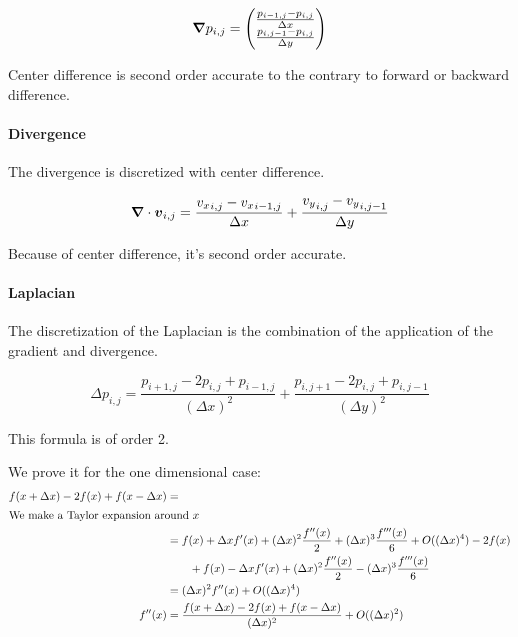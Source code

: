 \begin{equation}
  {\boldsymbol {\nabla}}p_{i,j}=\begin{pmatrix}
                       	\frac{p_{i-1,j}-p_{i,j}}{\Delta x}\\
                       	\frac{p_{i,j-1}-p_{i,j}}{\Delta y}\\
                       \end{pmatrix}
\end{equation}

Center difference is second order accurate to the contrary to forward or backward difference.

\paragraph{Divergence}
\label{fixed:divergence}
The divergence is discretized with center difference.

\begin{equation}
	{\boldsymbol {\nabla}}\cdot {\boldsymbol {v}}_{i,j}=\frac{{v_{x}}_{i,j}-{v_{x}}_{i-1,j}}{\Delta x}+\frac{{v_{y}}_{i,j}-{v_{y}}_{i,j-1}}{\Delta y}
\end{equation}

Because of center difference, it's second order accurate.

\paragraph{Laplacian}
\label{fixed:Laplacian}
The discretization of the Laplacian is the combination of the application of the gradient and divergence.

\begin{equation}
  \Delta p_{i,j}=\frac{p_{i+1,j}-2p_{i,j}+p_{i-1,j}}{(\Delta x)^2}+\frac{p_{i,j+1}-2p_{i,j}+p_{i,j-1}}{(\Delta y)^2}
\end{equation}

This formula is of order 2.

We prove it for the one dimensional case:
\begin{align*}
  f(x+\Delta x)-2f(x)+f(x-\Delta x)&=\\
  \intertext{We make a Taylor expansion around $x$}
  &=f(x)+\Delta x f'(x) +(\Delta x)^2 \frac{f''(x)}{2}+(\Delta x)^3 \frac{f'''(x)}{6}+O((\Delta x)^4)-2f(x)\\
  &\qquad+f(x)-\Delta x f'(x) +(\Delta x)^2 \frac{f''(x)}{2}-(\Delta x)^3 \frac{f'''(x)}{6}\\
  &=(\Delta x)^2f''(x) +O((\Delta x)^4)\\
  f''(x)&=\frac{f(x+\Delta x)-2f(x)+f(x-\Delta x)}{(\Delta x)^2}+O((\Delta x)^2)
\end{align*}

